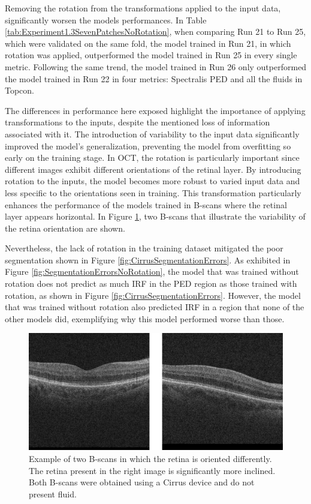 Removing the rotation from the transformations applied to the input data, significantly worsen the models performances. In Table \ref{tab:Experiment1.3SevenPatchesNoRotation}, when comparing Run 21 to Run 25, which were validated on the same fold, the model trained in Run 21, in which rotation was applied, outperformed the model trained in Run 25 in every single metric. Following the same trend, the model trained in Run 26 only outperformed the model trained in Run 22 in four metrics: Spectralis PED and all the fluids in Topcon.
\par
The differences in performance here exposed highlight the importance of applying transformations to the inputs, despite the mentioned loss of information associated with it. The introduction of variability to the input data significantly improved the model's generalization, preventing the model from overfitting so early on the training stage. In OCT, the rotation is particularly important since different images exhibit different orientations of the retinal layer. By introducing rotation to the inputs, the model becomes more robust to varied input data and less specific to the orientations seen in training. This transformation particularly enhances the performance of the models trained in B-scans where the retinal layer appears horizontal. In Figure \ref{fig:DifferentRetinaOrientation}, two B-scans that illustrate the variability of the retina orientation are shown.
\par
Nevertheless, the lack of rotation in the training dataset mitigated the poor segmentation shown in Figure \ref{fig:CirrusSegmentationErrors}. As exhibited in Figure \ref{fig:SegmentationErrorsNoRotation}, the model that was trained without rotation does not predict as much IRF in the PED region as those trained with rotation, as shown in Figure \ref{fig:CirrusSegmentationErrors}. However, the model that was trained without rotation also predicted IRF in a region that none of the other models did, exemplifying why this model performed worse than those.

\begin{figure}[!ht]
	\centering
	\includegraphics[width=0.7\linewidth]{figures/DifferentRetinaOrientation.png}
	\caption{Example of two B-scans in which the retina is oriented differently. The retina present in the right image is significantly more inclined. Both B-scans were obtained using a Cirrus device and do not present fluid.}
	\label{fig:DifferentRetinaOrientation}
\end{figure}

